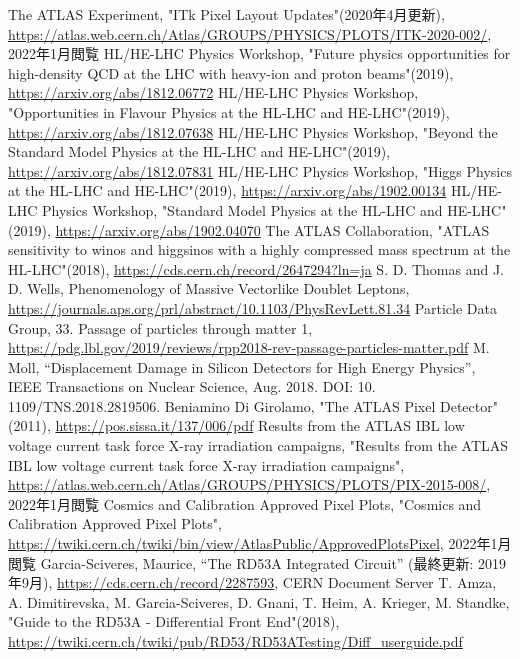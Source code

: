 \begin{thebibliography}{24}
The ATLAS Experiment, "ITk Pixel Layout Updates"(2020年4月更新), \url{https://atlas.web.cern.ch/Atlas/GROUPS/PHYSICS/PLOTS/ITK-2020-002/}, 2022年1月閲覧
HL/HE-LHC Physics Workshop, "Future physics opportunities for high-density QCD at the LHC with heavy-ion and proton beams"(2019), \url{https://arxiv.org/abs/1812.06772}
HL/HE-LHC Physics Workshop, "Opportunities in Flavour Physics at the HL-LHC and HE-LHC"(2019), \url{https://arxiv.org/abs/1812.07638}
HL/HE-LHC Physics Workshop, "Beyond the Standard Model Physics at the HL-LHC and HE-LHC"(2019), \url{https://arxiv.org/abs/1812.07831}
HL/HE-LHC Physics Workshop, "Higgs Physics at the HL-LHC and HE-LHC"(2019), \url{https://arxiv.org/abs/1902.00134}
HL/HE-LHC Physics Workshop, "Standard Model Physics at the HL-LHC and HE-LHC"(2019), \url{https://arxiv.org/abs/1902.04070}
The ATLAS Collaboration, "ATLAS sensitivity to winos and higgsinos with a highly compressed mass spectrum at the HL-LHC"(2018), \url{https://cds.cern.ch/record/2647294?ln=ja}
S. D. Thomas and J. D. Wells, Phenomenology of Massive Vectorlike Doublet Leptons, \url{https://journals.aps.org/prl/abstract/10.1103/PhysRevLett.81.34}
Particle Data Group, 33. Passage of particles through matter 1,
\url{https://pdg.lbl.gov/2019/reviews/rpp2018-rev-passage-particles-matter.pdf}
M. Moll, “Displacement Damage in Silicon Detectors for High Energy Physics”, IEEE Transactions on Nuclear Science, Aug. 2018. DOI: 10. 1109/TNS.2018.2819506.
Beniamino Di Girolamo, "The ATLAS Pixel Detector" (2011), \url{https://pos.sissa.it/137/006/pdf}
Results from the ATLAS IBL low voltage current task force X-ray irradiation campaigns, "Results from the ATLAS IBL low voltage current task force X-ray irradiation campaigns", \url{https://atlas.web.cern.ch/Atlas/GROUPS/PHYSICS/PLOTS/PIX-2015-008/}, 2022年1月閲覧
Cosmics and Calibration Approved Pixel Plots, "Cosmics and Calibration Approved Pixel Plots", \url{https://twiki.cern.ch/twiki/bin/view/AtlasPublic/ApprovedPlotsPixel}, 2022年1月閲覧
Garcia-Sciveres, Maurice, “The RD53A Integrated Circuit” (最終更新: 2019年9月), \url{https://cds.cern.ch/record/2287593}, CERN Document Server
T. Amza, A. Dimitirevska, M. Garcia-Sciveres, D. Gnani, T. Heim, A. Krieger, M. Standke, "Guide to the RD53A - Differential Front End"(2018), \url{https://twiki.cern.ch/twiki/pub/RD53/RD53ATesting/Diff_userguide.pdf}

\end{thebibliography}
